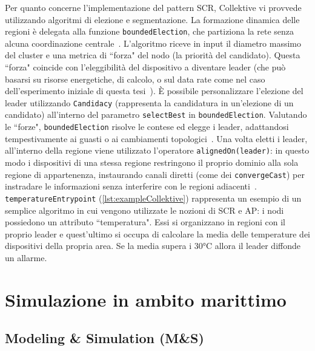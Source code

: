 Per quanto concerne l'implementazione del pattern \ac{SCR}, Collektive vi provvede utilizzando algoritmi di elezione e segmentazione. La formazione dinamica delle regioni è delegata alla funzione \texttt{boundedElection}, che partiziona la rete senza alcuna coordinazione centrale~\cite{11217861}. L'algoritmo riceve in input il diametro massimo del cluster e una metrica di ``forza" del nodo (la priorità del candidato).
Questa ``forza" coincide con l'eleggibilità del dispositivo a diventare leader (che può basarsi su risorse energetiche, di calcolo, o sul data rate come nel caso dell'esperimento iniziale di questa tesi~\cite{11217861}). È possibile personalizzare l'elezione del leader utilizzando \texttt{Candidacy} (rappresenta la candidatura in un'elezione di un candidato) all'interno del parametro \texttt{selectBest} in \texttt{boundedElection}. Valutando le ``forze", \texttt{boundedElection} risolve le contese ed elegge i leader, adattandosi tempestivamente ai guasti o ai cambiamenti topologici~\cite{11217861}. 
Una volta eletti i leader, all'interno della regione viene utilizzato l'operatore \texttt{alignedOn(leader)}: in questo modo i dispositivi di una stessa regione restringono il proprio dominio alla sola regione di appartenenza, instaurando canali diretti (come dei \texttt{convergeCast}) per instradare le informazioni senza interferire con le regioni adiacenti~\cite{11217861}.
\texttt{temperatureEntrypoint} (\cref{lst:exampleCollektive}) rappresenta un esempio di un semplice algoritmo in cui vengono utilizzate le nozioni di \ac{SCR} e \ac{AP}: i nodi possiedono un attributo ``temperatura". Essi si organizzano in regioni con il proprio leader e quest’ultimo si occupa di calcolare la media delle temperature dei dispositivi della propria area. Se la media supera i 30°C allora il leader diffonde un allarme.

\newpage

\section{Simulazione in ambito marittimo}
\label{sec:simulazione_ambito_marittimo}

\subsection{Modeling \& Simulation (M\&S)}
\label{sec:ms}

